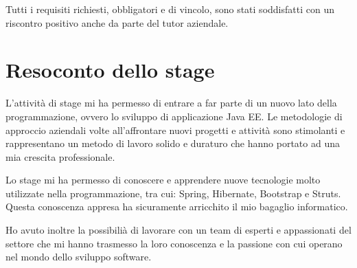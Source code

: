 \noindent Tutti i requisiti richiesti, obbligatori e di vincolo, sono stati soddisfatti con un riscontro positivo anche da parte del tutor aziendale. 

\pagebreak

\section{Resoconto dello stage}
L'attività di stage mi ha permesso di entrare a far parte di un nuovo lato della programmazione, ovvero lo sviluppo di applicazione Java EE. Le metodologie di approccio aziendali volte all'affrontare nuovi progetti e attività sono stimolanti e rappresentano un metodo di lavoro solido e duraturo che hanno portato ad una mia crescita professionale. 

\setlength{\parskip}{3ex}

\noindent Lo stage mi ha permesso di conoscere e apprendere nuove tecnologie molto utilizzate nella programmazione, tra cui: Spring, Hibernate, Bootstrap e Struts. Questa conoscenza appresa ha sicuramente arricchito il mio bagaglio informatico.

\setlength{\parskip}{3ex}

\noindent Ho avuto inoltre la possibilià di lavorare con un team di esperti e appassionati del settore che mi hanno trasmesso la loro conoscenza e la passione con cui operano nel mondo dello sviluppo software.